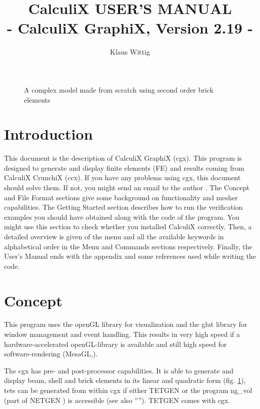 \documentclass{article}
\begin{document}
\title{CalculiX USER'S MANUAL\\ - CalculiX GraphiX, Version 2.19 -}
\author{Klaus Wittig}
\maketitle
\begin{figure}[h]
\caption{\label{cover} A complex model made from scratch using second order brick elements }
\end{figure}
\newpage


\tableofcontents


\section{Introduction}
 This document is the description of CalculiX GraphiX (cgx). This program is designed to generate and display finite elements (FE) and results coming from CalculiX CrunchiX (ccx). If you have any problems using cgx, this document should solve them. If not, you might send an email to the author \cite{cgx}. The Concept and File Format sections give some background on functionality and mesher capabilities. The Getting Started section describes how to run the verification examples you should have obtained along with the code of the program. You might use this section to check whether you installed CalculiX correctly. Then, a detailed overview is given of the menu and all the available keywords in alphabetical order in the Menu and Commands sections respectively. Finally, the User's Manual ends with the appendix and some references used while writing the code.


\section{Concept}
This program uses the openGL library for visualization and the glut library \cite{glut} for window management and event handling. This results in very high speed if a hardware-accelerated openGL-library is available and still high speed for software-rendering (MesaGL,\cite{mesa}). 

The cgx has pre- and post-processor capabilities. It is able to generate and display beam, shell and brick elements in its linear and quadratic form (fig. \ref{cover}), tets can be generated from within cgx if either TETGEN \cite{TETGEN} or the program ng\_vol (part of NETGEN \cite{NETGEN}) is accessible (see also ''''). TETGEN comes with cgx.
\end{document}
